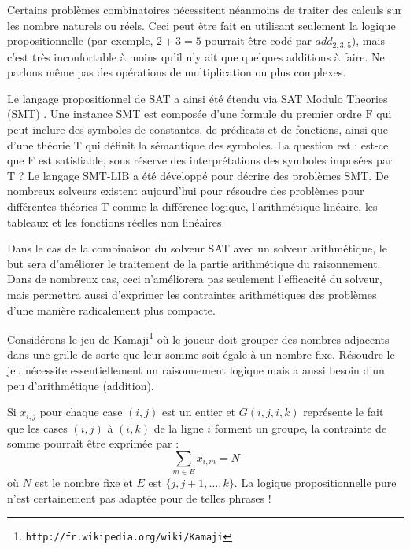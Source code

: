 



Certains problèmes combinatoires nécessitent néanmoins de traiter des calculs sur les nombre naturels ou réels. Ceci peut être fait en utilisant seulement la logique propositionnelle (par exemple, $2+3=5$ pourrait être codé par $add_{2,3,5}$), mais c'est très inconfortable à moins qu'il n'y ait que quelques additions à faire. Ne parlons même pas des opérations de multiplication ou plus complexes. 

Le langage propositionnel de SAT a ainsi été étendu via SAT Modulo Theories (SMT) \cite{DBLP:journals/jacm/NieuwenhuisOT06}.
Une instance SMT est composée d'une formule du premier ordre $\mathrm{F}$ qui peut inclure des symboles de constantes, de prédicats et de fonctions, ainsi que d'une théorie $\mathrm{T}$ qui définit la sémantique des symboles. La question est : est-ce que $\mathrm{F}$ est satisfiable, sous réserve des interprétations des symboles imposées par $\mathrm{T}$ ?
Le langage SMT-LIB \cite{BarFT-SMTLIB} a été développé pour décrire des problèmes SMT. De nombreux solveurs existent aujourd'hui pour résoudre des problèmes pour différentes théories $\mathrm{T}$ comme la différence logique, l'arithmétique linéaire, les tableaux et les fonctions réelles non linéaires. %

Dans le cas de la combinaison du solveur SAT avec un solveur arithmétique, le but sera d'améliorer le traitement de la partie arithmétique du raisonnement. Dans de nombreux cas, ceci n'améliorera pas seulement l'efficacité du solveur, mais permettra aussi d'exprimer les contraintes arithmétiques des problèmes d'une manière radicalement plus compacte.

Considérons le jeu de Kamaji\footnote{\texttt{http://fr.wikipedia.org/wiki/Kamaji}}  où le joueur doit grouper des nombres adjacents dans une grille de sorte que leur somme soit égale à un nombre fixe. Résoudre le jeu nécessite essentiellement un raisonnement logique mais a aussi besoin d'un peu d'arithmétique (addition).


Si $x_{i,j}$ pour chaque case $(i,j)$ est un entier et $G(i,j,i,k)$ représente le fait que les cases $(i,j)$ à $(i,k)$ de la ligne $i$ forment un groupe, la contrainte de somme pourrait être exprimée par :
$$\sum_{m\in E}x_{i,m}=N$$
où $N$ est le nombre fixe et $E$ est $\{j,j+1,\ldots,k\}$. La logique propositionnelle pure n'est certainement pas adaptée pour de telles phrases !